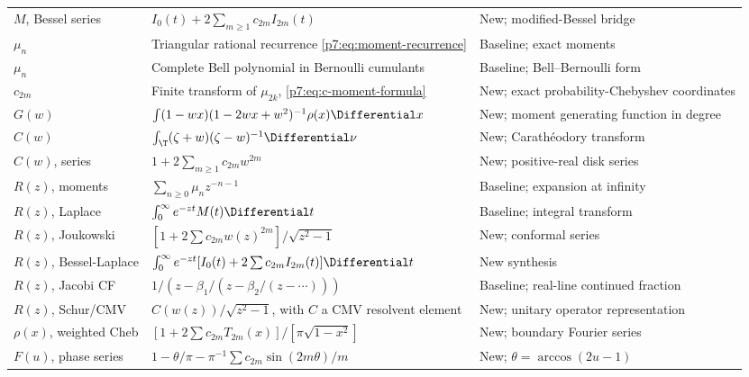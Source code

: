 \documentclass[11pt]{article}
\theoremstyle{definition}
\theoremstyle{remark}
\begin{document}
\begin{longtable}{p{}p{}p{}}
\(M\), Bessel series &
\(I_0(t)+2\sum_{m\ge1}c_{2m}I_{2m}(t)\) &
New; modified-Bessel bridge\\

\(\mu_n\) &
Triangular rational recurrence \eqref{p7:eq:moment-recurrence} &
Baseline; exact moments\\

\(\mu_n\) &
Complete Bell polynomial in Bernoulli cumulants &
Baseline; Bell--Bernoulli form\\

\(c_{2m}\) &
Finite transform of \(\mu_{2k}\), \eqref{p7:eq:c-moment-formula} &
New; exact probability-Chebyshev coordinates\\

\(G(w)\) &
\(\int(1-wx)(1-2wx+w^2)^{-1}\rho(x)\Differential x\) &
New; moment generating function in degree\\

\(C(w)\) &
\(\int_{\T}(\zeta+w)(\zeta-w)^{-1}\Differential\nu\) &
New; Carath\'eodory transform\\

\(C(w)\), series &
\(1+2\sum_{m\ge1}c_{2m}w^{2m}\) &
New; positive-real disk series\\

\(R(z)\), moments &
\(\sum_{n\ge0}\mu_nz^{-n-1}\) &
Baseline; expansion at infinity\\

\(R(z)\), Laplace &
\(\int_0^\infty e^{-zt}M(t)\Differential t\) &
Baseline; integral transform\\

\(R(z)\), Joukowski &
\([1+2\sum c_{2m}w(z)^{2m}]/\sqrt{z^2-1}\) &
New; conformal series\\

\(R(z)\), Bessel-Laplace &
\(\int_0^\infty e^{-zt}[I_0(t)+2\sum c_{2m}I_{2m}(t)]\Differential t\) &
New synthesis\\

\(R(z)\), Jacobi CF &
\(1/(z-\beta_1/(z-\beta_2/(z-\cdots)))\) &
Baseline; real-line continued fraction\\

\(R(z)\), Schur/CMV &
\(C(w(z))/\sqrt{z^2-1}\), with \(C\) a CMV resolvent element &
New; unitary operator representation\\

\(\rho(x)\), weighted Cheb &
\([1+2\sum c_{2m}T_{2m}(x)]/[\pi\sqrt{1-x^2}]\) &
New; boundary Fourier series\\

\(F(u)\), phase series &
\(1-\theta/\pi-\pi^{-1}\sum c_{2m}\sin(2m\theta)/m\) &
New; \(\theta=\arccos(2u-1)\)\\


\end{longtable}
\end{document}
